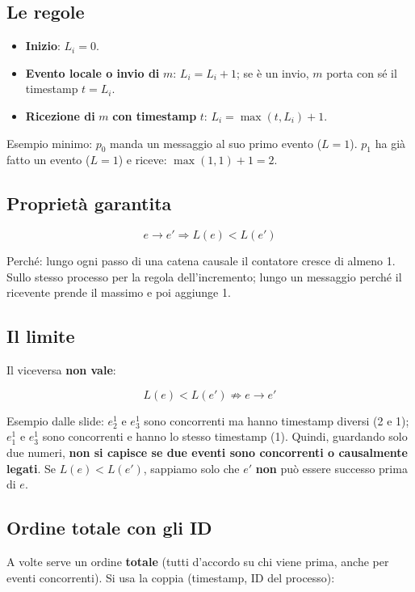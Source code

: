 \subsection{Le regole}

\begin{itemize}
\tightlist
\item
  \textbf{Inizio}: \(L_i = 0\).
\item
  \textbf{Evento locale o invio di} \(m\): \(L_i = L_i + 1\); se è un invio, \(m\) porta con sé il timestamp \(t = L_i\).
\item
  \textbf{Ricezione di} \(m\) \textbf{con timestamp} \(t\): \(L_i = \max(t, L_i) + 1\).
\end{itemize}

Esempio minimo: \(p_0\) manda un messaggio al suo primo evento (\(L = 1\)). \(p_1\) ha già fatto un evento (\(L = 1\)) e riceve: \(\max(1, 1) + 1 = 2\).

\subsection{Proprietà garantita}

\[
e \to e' \Rightarrow L(e) < L(e')
\]

Perché: lungo ogni passo di una catena causale il contatore cresce di almeno 1. Sullo stesso processo per la regola dell'incremento; lungo un messaggio perché il ricevente prende il massimo e poi aggiunge 1.

\subsection{Il limite}

Il viceversa \textbf{non vale}:

\[
L(e) < L(e') \not\Rightarrow e \to e'
\]

Esempio dalle slide: \(e^1_2\) e \(e^1_3\) sono concorrenti ma hanno timestamp diversi (2 e 1); \(e^1_1\) e \(e^1_3\) sono concorrenti e hanno lo stesso timestamp (1). Quindi, guardando solo due numeri, \textbf{non si capisce se due eventi sono concorrenti o causalmente legati}. Se \(L(e) < L(e')\), sappiamo solo che \(e'\) \textbf{non} può essere successo prima di \(e\).

\subsection{Ordine totale con gli ID}

A volte serve un ordine \textbf{totale} (tutti d'accordo su chi viene prima, anche per eventi concorrenti). Si usa la coppia (timestamp, ID del processo):

